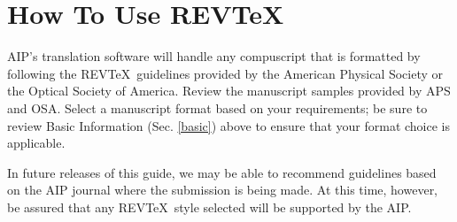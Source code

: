 \section{How To Use REV\TeX}

AIP's translation software will handle any compuscript that is formatted by
following the REV\TeX\ guidelines provided by the American Physical Society
or the Optical Society of America.  Review the manuscript samples provided
by APS and OSA.  Select a manuscript format based on your requirements; be
sure to review Basic Information (Sec. \ref{basic}) above to ensure that
your format choice is applicable.

In future releases of this guide, we may be able to recommend guidelines
based on the AIP journal where the submission is being made.  At this time,
however, be assured that any REV\TeX\ style selected will be supported by
the AIP.


